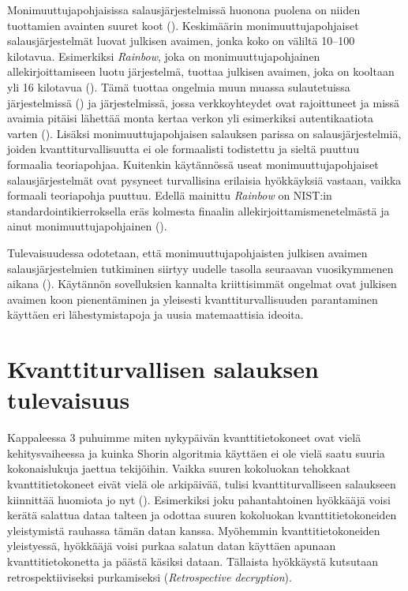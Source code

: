Monimuuttujapohjaisissa salausjärjestelmissä huonona puolena on niiden tuottamien avainten suuret koot (\cite{8012305}). Keskimäärin monimuuttujapohjaiset salausjärjestelmät luovat julkisen avaimen, jonka koko on väliltä 10--100 kilotavua. Esimerkiksi \emph{Rainbow}, joka on monimuuttujapohjainen allekirjoittamiseen luotu järjestelmä, tuottaa julkisen avaimen, joka on kooltaan yli 16 kilotavua (\cite{Ding2009}). Tämä tuottaa ongelmia muun muassa sulautetuissa järjestelmissä (\cite{8012305}) ja järjestelmissä, jossa verkkoyhteydet ovat rajoittuneet ja missä avaimia pitäisi lähettää monta kertaa verkon yli esimerkiksi autentikaatiota varten (\cite{Ding2009}). Lisäksi monimuuttujapohjaisen salauksen parissa on salausjärjestelmiä, joiden kvanttiturvallisuutta ei ole formaalisti todistettu ja sieltä puuttuu formaalia teoriapohjaa. Kuitenkin käytännössä useat monimuuttujapohjaiset salausjärjestelmät ovat pysyneet turvallisina erilaisia hyökkäyksiä vastaan, vaikka formaali teoriapohja puuttuu. Edellä mainittu \emph{Rainbow} on NIST:in standardointikierroksella eräs kolmesta finaalin allekirjoittamismenetelmästä ja ainut monimuuttujapohjainen (\cite{alagic2020status}).

Tulevaisuudessa odotetaan, että monimuuttujapohjaisten julkisen avaimen salausjärjestelmien tutkiminen siirtyy uudelle tasolla seuraavan vuosikymmenen aikana (\cite{Ding2009}). Käytännön sovelluksien kannalta kriittisimmät ongelmat ovat julkisen avaimen koon pienentäminen ja yleisesti kvanttiturvallisuuden parantaminen käyttäen eri lähestymistapoja ja uusia matemaattisia ideoita.

\section{Kvanttiturvallisen salauksen tulevaisuus}
Kappaleessa 3 puhuimme miten nykypäivän kvanttitietokoneet ovat vielä kehitysvaiheessa ja kuinka Shorin algoritmia käyttäen ei ole vielä saatu suuria kokonaislukuja jaettua tekijöihin. Vaikka suuren kokoluokan tehokkaat kvanttitietokoneet eivät vielä ole arkipäivää, tulisi kvanttiturvalliseen salaukseen kiinnittää huomiota jo nyt (\cite{ad93d053a85c4acebdd49cbe1a75d6bd}). Esimerkiksi joku pahantahtoinen hyökkääjä voisi kerätä salattua dataa talteen ja odottaa suuren kokoluokan kvanttitietokoneiden yleistymistä rauhassa tämän datan kanssa. Myöhemmin kvanttitietokoneiden yleistyessä, hyökkääjä voisi purkaa salatun datan käyttäen apunaan kvanttitietokonetta ja päästä käsiksi dataan. Tällaista hyökkäystä kutsutaan retrospektiiviseksi purkamiseksi (\emph{Retrospective decryption}).